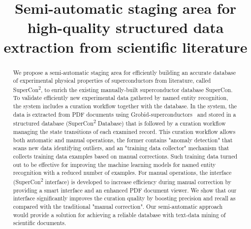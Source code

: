 \documentclass[]{interact}
\theoremstyle{plain} %
\theoremstyle{definition}
\theoremstyle{remark}
\begin{document}

\title{Semi-automatic staging area for high-quality structured data extraction from scientific literature}

\author{
}

\maketitle

\begin{abstract}
We propose a semi-automatic staging area for efficiently building an accurate database of experimental physical properties of superconductors from literature, called SuperCon\textsuperscript{2}, to enrich the existing manually-built superconductor database SuperCon. To validate efficiently new experimental data gathered by named entity recognition, the system includes a curation workflow together with the database. In the system, the data is extracted from PDF documents using Grobid-superconductors~\cite{lfoppiano2023automatic} and stored in a structured database (SuperCon\textsuperscript{2} Database) that is followed by a curation workflow managing the state transitions of each examined record. This curation workflow allows both automatic and manual operations, the former contains "anomaly detection" that scans new data identifying outliers, and an "training data collector" mechanism that collects training data examples based on manual corrections. Such training data turned out to be effective for improving the machine learning models for named entity recognition with a reduced number of examples. For manual operations, the interface (SuperCon\textsuperscript{2} interface) is developed to increase efficiency during manual correction by providing a smart interface and an enhanced PDF document viewer. We show that our interface significantly improves the curation quality by boosting precision and recall as compared with the traditional "manual correction".  Our semi-automatic approach would provide a solution for achieving a reliable database with text-data mining of scientific documents.

\end{abstract}
\end{document}
